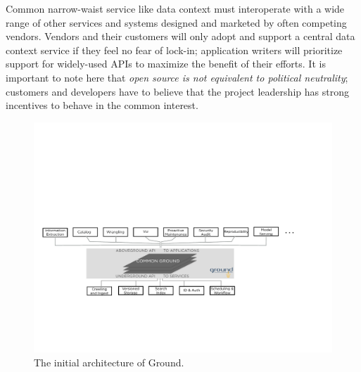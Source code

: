 \documentclass{sig-alternate}
\begin{document}
Common narrow-waist service like data context must interoperate with a wide range of other services and systems designed and marketed by often competing vendors.
Vendors and their customers will only adopt and support a central data context service if they feel no fear of lock-in; application writers will prioritize support for widely-used APIs to maximize the benefit of their efforts. 
It is important to note here that \emph{open source is not equivalent to political neutrality}; customers and developers have to believe that the project leadership has strong incentives to behave in the common interest. 


\begin{figure}[th]
\centering
\includegraphics[width=0.75\linewidth]{groundarch.pdf}
\caption{The initial architecture of Ground.}
\label{fig:arch}
\end{figure}
\end{document}
